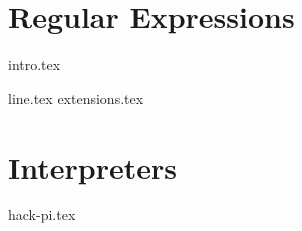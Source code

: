 \documentclass{exam}
\begin{document}
\newpage
\section{Regular Expressions}
{intro.tex}
\newpage
\begin{questions}
{line.tex}
{extensions.tex}
\end{questions}

\section{Interpreters}
\begin{questions}
{hack-pi.tex}
\end{questions}

\end{document}
